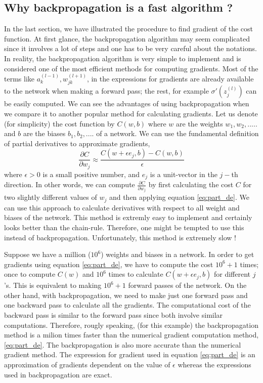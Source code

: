 \subsection{Why backpropagation is a fast algorithm ?}
In the last section, we have illustrated the procedure to find gradient of the cost function. At first glance, the backpropagation algorithm may
seem complicated since it involves a lot of steps and one has to be very careful about the notations. In reality, the backpropagation algorithm is very 
simple to implement and is considered one of the most efficient methods for computing gradients. Most of the terms like $a_k^{(l-1)}, w_{jk}^{(l+1)}$, in 
the expressions for gradients are already available to the network when making a forward pass; the rest, for example $\sigma'(z_j^{(l)})$ can be easily computed.
We can see the advantages of using backpropagation when we compare it to another popular method for calculating gradients. Let us denote (for simplicity) the cost function by $C(w,b)$ 
where $w$ are the weights $w_1,w_2,.....$ and $b$ are the biases $b_1,b_2,....$ of a network. We can use the fundamental definition of partial derivatives to approximate gradients,
\begin{equation}
    \label{eq:part_de}
    \frac{\partial C}{\partial w_j} \approx \frac{C(w + \epsilon e_j, b) - C(w,b)}{\epsilon}
\end{equation}
where $\epsilon > 0$ is a small positive number, and $e_j$ is a unit-vector in the $j-$th direction. In other words, we can compute $\frac{\partial C}{\partial w_j}$ by first 
calculating the cost $C$ for two slightly  different values of $w_j$ and then applying equation \eqref{eq:part_de}. We can use this approach to 
calculate derivatives with respect to all weight and biases of the network. This method is extremly easy to implement and certainly looks better than the chain-rule. Therefore, one
might be tempted to use this instead of backpropagation. Unfortunately, this method is extremely slow ! 

Suppose we have a million ($10^6$) weights and biases in a network. In order to get 
gradients using equation \eqref{eq:part_de}, we have to compute the cost $10^6 + 1$ times; once to compute $C(w)$ and $10^6$ times to calculate $C(w + \epsilon e_j, b)$ for different $j$'s. This is equivalent to making
$10^6 +1$ forward passes of the network. On the other hand, with backpropagation, we need to make just one forward pass and one backward pass to calculate all the gradients. The computational cost 
of the backward pass is similar to the forward pass since both involve similar computations. Therefore, rougly speaking, (for this example) the backpropagation method is a milion times faster than the numerical gradient computation method, \eqref{eq:part_de}.
The backpropagation is also more accurate than the numerical gradient method. The expression for gradient used in equation \eqref{eq:part_de} is an approximation of gradients dependent on the value of $\epsilon$ whereas the expressions used in backpropagation are exact.
